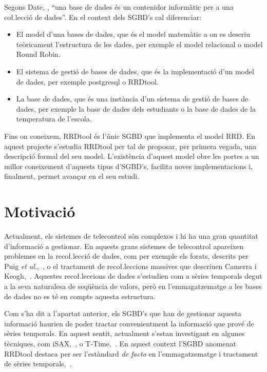 Segons Date, \cite{Date}, ``una base de dades és un contenidor
informàtic per a una co\l.lecció de dades''. En el context dels SGBD's
cal diferenciar:
\begin{itemize}
\item El model d'una bases de dades, que és el model matemàtic a on es
  descriu teòricament l'estructura de les dades, per exemple el model
  relacional o model Round Robin.

\item El sistema de gestió de bases de dades, que és la implementació
  d'un model de dades, per exemple postgresql o
  RRDtool. 

\item La base de dades, que és una instància d'un sistema de gestió de
  bases de dades, per exemple la base de dades dels estudiants o la
  base de dades de la temperatura de l'escola.
\end{itemize}

Fins  on coneixem,  RRDtool és  l'únic SGBD  que  implementa el
model  RRD. En  aquest projecte  s'estudia RRDtool  per  tal de
proposar,  per primera vegada,  una descripció  formal del  seu model.
L'existència d'aquest  model obre les  portes a un  millor coneixement
d'aquests tipus d'SGBD's, facilita noves implementacions i, finalment,
permet avançar en el seu estudi.


\section{Motivació}

Actualment, els sistemes de telecontrol són complexos i hi ha una gran
quantitat d'informació a gestionar. En aquests grans sistemes de
telecontrol apareixen problemes en la reco\l.lecció de dades, com per
exemple els forats, descrits per Puig \emph{et al.},~\cite{puig10}, o
el tractament de reco\l.leccions massives que descriuen Camerra i
Keogh,~\cite{keogh10:isax}. Aquestes reco\l.leccions de dades
s'estudien com a sèries temporals degut a la seva naturalesa de
seqüència de valors, però en l'emmagatzematge a les bases de dades no
es té en compte aquesta estructura.

Com s'ha dit a l'apartat anterior, els SGBD's que han de gestionar
aquesta informació haurien de poder tractar convenientment la
informació que prové de sèries temporals. En aquest sentit, actualment
s'estan investigant en algunes tècniques, com iSAX,~\cite{isax}, o
T-Time,~\cite{assfalg08:ttime}. En aquest context l'SGBD anomenat
RRDtool destaca per ser l'estàndard \emph{de facto} en
l'emmagatzematge i tractament de sèries temporals,~\cite{rrdtool}.


